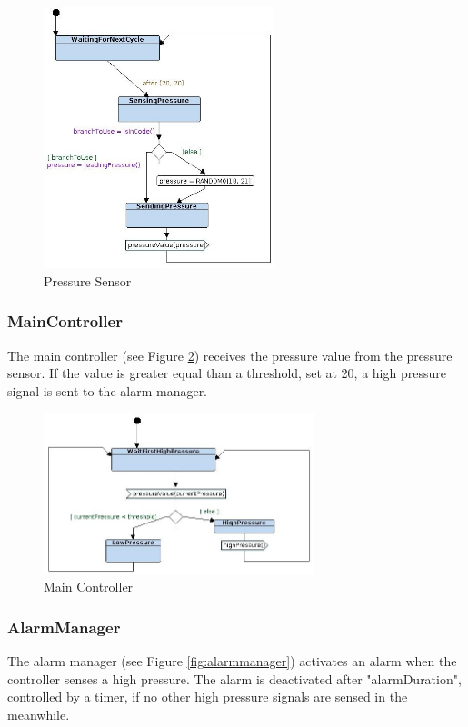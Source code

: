 \documentclass[12pt]{article}
\begin{document}
\begin{figure}[h!]
\centering
\includegraphics[width=0.6\textwidth]{images/pressuresensor.jpg}
\caption{Pressure Sensor}
\label{fig:pressuresensor}
\end{figure}

\subsubsection{MainController}
The main controller (see Figure \ref{fig:maincontroller}) receives the pressure value from the pressure sensor. If the value is greater equal than a threshold, set at 20, a high pressure signal is sent to the alarm manager.

\begin{figure}[h!]
\centering
\includegraphics[width=0.7\textwidth]{images/maincontroller.jpg}
\caption{Main Controller}
\label{fig:maincontroller}
\end{figure}

\subsubsection{AlarmManager}
The alarm manager (see Figure \ref{fig:alarmmanager}) activates an alarm when the controller senses a high pressure. The alarm is deactivated after "alarmDuration", controlled by a timer, if no other high pressure signals are sensed in the meanwhile.
\end{document}
